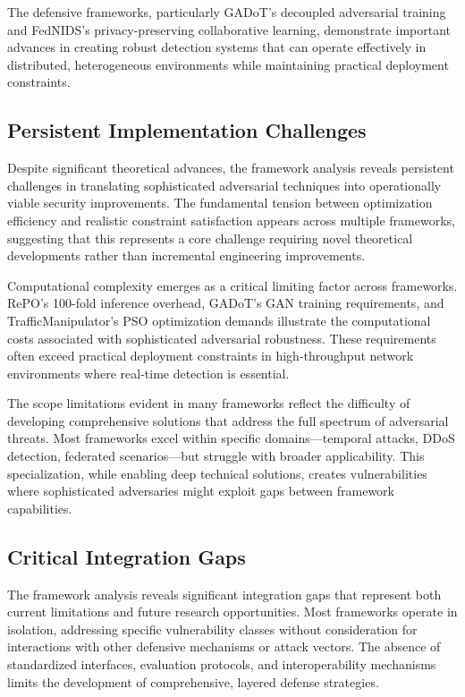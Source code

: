 The defensive frameworks, particularly GADoT's decoupled adversarial training and FedNIDS's privacy-preserving collaborative learning, demonstrate important advances in creating robust detection systems that can operate effectively in distributed, heterogeneous environments while maintaining practical deployment constraints.

\subsection{Persistent Implementation Challenges}

Despite significant theoretical advances, the framework analysis reveals persistent challenges in translating sophisticated adversarial techniques into operationally viable security improvements. The fundamental tension between optimization efficiency and realistic constraint satisfaction appears across multiple frameworks, suggesting that this represents a core challenge requiring novel theoretical developments rather than incremental engineering improvements.

Computational complexity emerges as a critical limiting factor across frameworks. RePO's 100-fold inference overhead, GADoT's GAN training requirements, and TrafficManipulator's PSO optimization demands illustrate the computational costs associated with sophisticated adversarial robustness. These requirements often exceed practical deployment constraints in high-throughput network environments where real-time detection is essential.

The scope limitations evident in many frameworks reflect the difficulty of developing comprehensive solutions that address the full spectrum of adversarial threats. Most frameworks excel within specific domains—temporal attacks, DDoS detection, federated scenarios—but struggle with broader applicability. This specialization, while enabling deep technical solutions, creates vulnerabilities where sophisticated adversaries might exploit gaps between framework capabilities.

\subsection{Critical Integration Gaps}

The framework analysis reveals significant integration gaps that represent both current limitations and future research opportunities. Most frameworks operate in isolation, addressing specific vulnerability classes without consideration for interactions with other defensive mechanisms or attack vectors. The absence of standardized interfaces, evaluation protocols, and interoperability mechanisms limits the development of comprehensive, layered defense strategies.

